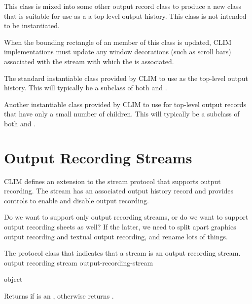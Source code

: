 
This class is mixed into some other output record class to produce a new class
that is suitable for use as a a top-level output history.  This class is not
intended to be instantiated.

When the bounding rectangle of an member of this class is updated, CLIM
implementations must update any window decorations (such as scroll bars)
associated with the stream with which the   is
associated.


The standard instantiable class provided by CLIM to use as the top-level output
history.  This will typically be a subclass of both
 and .


Another instantiable class provided by CLIM to use for top-level output records
that have only a small number of children.  This will typically be a subclass of
both  and .


\section {Output Recording Streams}

CLIM defines an extension to the stream protocol that supports output recording.
The stream has an associated output history record and provides controls to
enable and disable output recording.

 {Do we want to support only output recording streams, or do we
want to support output recording sheets as well?  If the latter, we need to
split apart graphics output recording and textual output recording, and rename
lots of things.}


The protocol class that indicates that a stream is an output recording stream.
 {output recording stream} {output-recording-stream}

 {object}

Returns  if  is an ,
otherwise returns .


